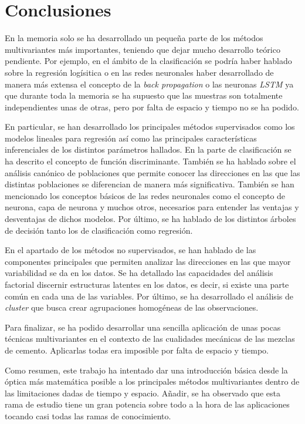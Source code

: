 \chapter{Conclusiones}

En la memoria solo se ha desarrollado un pequeña parte de los métodos multivariantes más importantes, teniendo que dejar mucho desarrollo teórico pendiente. Por ejemplo, en el ámbito de la clasificación se podría haber hablado sobre la regresión logísitica o en las redes neuronales haber desarrollado de manera más extensa el concepto de la \emph{back propagation} o las neuronas \emph{LSTM} ya que durante toda la memoria se ha supuesto que las muestras son totalmente independientes unas de otras, pero por falta de espacio y tiempo no se ha podido.  

\noindent En particular, se han desarrollado los principales métodos supervisados como los modelos lineales para regresión así como las principales características inferenciales de los distintos parámetros hallados. En la parte de clasificación se ha descrito el concepto de función discriminante. También  se ha hablado sobre el análisis canónico de poblaciones que permite conocer las direcciones en las que las distintas poblaciones se diferencian de manera más significativa. También se han mencionado los conceptos básicos de las redes neuronales como el concepto de neurona, capa de neurona y muchos otros, necesarios para entender las ventajas y desventajas de dichos modelos. Por último,  se ha hablado de los distintos árboles de decisión tanto los de clasificación como regresión.

\noindent En el apartado de los métodos no  supervisados, se han hablado de las componentes principales que permiten analizar las direcciones en las que mayor variabilidad se da en los datos. Se ha detallado las capacidades del análisis factorial discernir estructuras latentes en los datos, es decir, si existe una parte común en cada una de las variables. Por último, se ha desarrollado el análisis de \emph{cluster} que busca crear agrupaciones homogéneas de las observaciones. 

\noindent Para finalizar, se ha podido desarrollar una sencilla aplicación de unas pocas técnicas multivariantes en el contexto de las cualidades mecánicas de las mezclas de cemento. Aplicarlas todas era imposible por falta de espacio y tiempo. 

\noindent Como resumen, este trabajo ha intentado dar una introducción básica desde la óptica más matemática posible a los principales métodos multivariantes dentro de las limitaciones dadas de tiempo y espacio. Añadir, se ha observado que esta rama de estudio tiene un gran potencia sobre todo a la hora de las aplicaciones tocando casi todas las ramas de conocimiento. 


